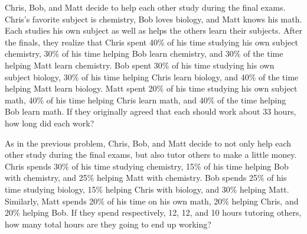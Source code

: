 \begin{puzzle}
    Chris, Bob, and Matt decide to help each other study during the final exams. Chris's favorite
    subject is chemistry, Bob loves biology, and Matt knows his math. Each studies his own subject
    as well as helps the others learn their subjects. After the finals, they realize that Chris spent 40\%
    of his time studying his own subject chemistry, 30\% of his time helping Bob learn chemistry, and
    30\% of the time helping Matt learn chemistry. Bob spent 30\% of his time studying his own subject
    biology, 30\% of his time helping Chris learn biology, and 40\% of the time helping Matt learn biology.
    Matt spent 20\% of his time studying his own subject math, 40\% of his time helping Chris learn math, and 40\% of the time helping Bob learn math. If they originally agreed that each should work
    about 33 hours, how long did each work?
\end{puzzle}

\begin{puzzle}
    As in the previous problem, Chris, Bob, and Matt decide to not only help each other study during
    the final exams, but also tutor others to make a little money. Chris spends 30\% of his time studying
    chemistry, 15\% of his time helping Bob with chemistry, and 25\% helping Matt with chemistry. Bob
    spends 25\% of his time studying biology, 15\% helping Chris with biology, and 30\% helping Matt.
    Similarly, Matt spends 20\% of his time on his own math, 20\% helping Chris, and 20\% helping Bob.
    If they spend respectively, 12, 12, and 10 hours tutoring others, how many total hours are they
    going to end up working?
\end{puzzle}
